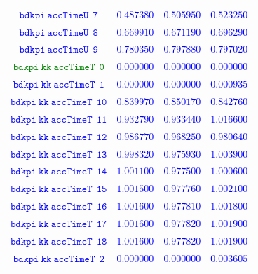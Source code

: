 \documentclass[10pt,a4paper]{article}
\begin{document}
\begin{table}[h!]
{\begin{tabular}{cccc}
\textcolor{blue}{$\mathtt{bdkpi~accTimeU~~7}$} & \textcolor{blue}{$0.487380$}& \textcolor{blue}{$0.505950$}& \textcolor{blue}{$0.523250$}\\
\textcolor{blue}{$\mathtt{bdkpi~accTimeU~~8}$} & \textcolor{blue}{$0.669910$}& \textcolor{blue}{$0.671190$}& \textcolor{blue}{$0.696290$}\\
\textcolor{blue}{$\mathtt{bdkpi~accTimeU~~9}$} & \textcolor{blue}{$0.780350$}& \textcolor{blue}{$0.797880$}& \textcolor{blue}{$0.797020$}\\
\textcolor{Green}{$\mathtt{bdkpi~kk~accTimeT~~0}$} & \textcolor{blue}{$0.000000$}& \textcolor{blue}{$0.000000$}& \textcolor{blue}{$0.000000$}\\
\textcolor{blue}{$\mathtt{bdkpi~kk~accTimeT~~1}$} & \textcolor{blue}{$0.000000$}& \textcolor{blue}{$0.000000$}& \textcolor{blue}{$0.000935$}\\
\textcolor{blue}{$\mathtt{bdkpi~kk~accTimeT~~10}$} & \textcolor{blue}{$0.839970$}& \textcolor{blue}{$0.850170$}& \textcolor{blue}{$0.842760$}\\
\textcolor{blue}{$\mathtt{bdkpi~kk~accTimeT~~11}$} & \textcolor{blue}{$0.932790$}& \textcolor{blue}{$0.933440$}& \textcolor{blue}{$1.016600$}\\
\textcolor{blue}{$\mathtt{bdkpi~kk~accTimeT~~12}$} & \textcolor{blue}{$0.986770$}& \textcolor{blue}{$0.968250$}& \textcolor{blue}{$0.980640$}\\
\textcolor{blue}{$\mathtt{bdkpi~kk~accTimeT~~13}$} & \textcolor{blue}{$0.998320$}& \textcolor{blue}{$0.975930$}& \textcolor{blue}{$1.003900$}\\
\textcolor{blue}{$\mathtt{bdkpi~kk~accTimeT~~14}$} & \textcolor{blue}{$1.001100$}& \textcolor{blue}{$0.977500$}& \textcolor{blue}{$1.000600$}\\
\textcolor{blue}{$\mathtt{bdkpi~kk~accTimeT~~15}$} & \textcolor{blue}{$1.001500$}& \textcolor{blue}{$0.977760$}& \textcolor{blue}{$1.002100$}\\
\textcolor{blue}{$\mathtt{bdkpi~kk~accTimeT~~16}$} & \textcolor{blue}{$1.001600$}& \textcolor{blue}{$0.977810$}& \textcolor{blue}{$1.001800$}\\
\textcolor{blue}{$\mathtt{bdkpi~kk~accTimeT~~17}$} & \textcolor{blue}{$1.001600$}& \textcolor{blue}{$0.977820$}& \textcolor{blue}{$1.001900$}\\
\textcolor{blue}{$\mathtt{bdkpi~kk~accTimeT~~18}$} & \textcolor{blue}{$1.001600$}& \textcolor{blue}{$0.977820$}& \textcolor{blue}{$1.001900$}\\
\textcolor{blue}{$\mathtt{bdkpi~kk~accTimeT~~2}$} & \textcolor{blue}{$0.000000$}& \textcolor{blue}{$0.000000$}& \textcolor{blue}{$0.003605$}\\

\end{tabular}}
\end{table}
\end{document}
